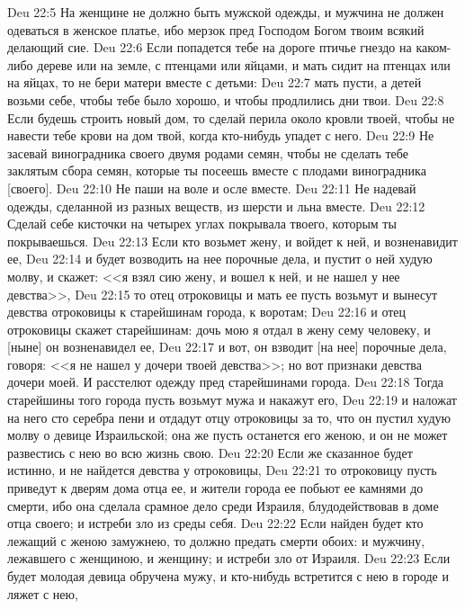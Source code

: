 \rsbpar\vs Deu 22:5 На женщине не должно быть мужской одежды, и мужчина не должен одеваться в женское платье, ибо мерзок пред Господом Богом твоим всякий делающий сие.
\rsbpar\vs Deu 22:6 Если попадется тебе на дороге птичье гнездо на каком-либо дереве или на земле, с птенцами или яйцами, и мать сидит на птенцах или на яйцах, то не бери матери вместе с детьми:
\vs Deu 22:7 мать пусти, а детей возьми себе, чтобы тебе было хорошо, и чтобы продлились дни твои.
\rsbpar\vs Deu 22:8 Если будешь строить новый дом, то сделай перила около кровли твоей, чтобы не навести тебе крови на дом твой, когда кто-нибудь упадет с него.
\rsbpar\vs Deu 22:9 Не засевай виноградника своего двумя родами семян, чтобы не сделать тебе заклятым сбора семян, которые ты посеешь вместе с плодами виноградника [своего].
\vs Deu 22:10 Не паши на воле и осле вместе.
\vs Deu 22:11 Не надевай одежды, сделанной из разных веществ, из шерсти и льна вместе.
\vs Deu 22:12 Сделай себе кисточки на четырех углах покрывала твоего, которым ты покрываешься.
\rsbpar\vs Deu 22:13 Если кто возьмет жену, и войдет к ней, и возненавидит ее,
\vs Deu 22:14 и будет возводить на нее порочные дела, и пустит о ней худую молву, и скажет: <<я взял сию жену, и вошел к ней, и не нашел у нее девства>>,
\vs Deu 22:15 то отец отроковицы и мать ее пусть возьмут и вынесут  девства отроковицы к старейшинам города, к воротам;
\vs Deu 22:16 и отец отроковицы скажет старейшинам: дочь мою я отдал в жену сему человеку, и [ныне] он возненавидел ее,
\vs Deu 22:17 и вот, он взводит [на нее] порочные дела, говоря: <<я не нашел у дочери твоей девства>>; но вот признаки девства дочери моей. И расстелют одежду пред старейшинами города.
\vs Deu 22:18 Тогда старейшины того города пусть возьмут мужа и накажут его,
\vs Deu 22:19 и наложат на него сто  серебра пени и отдадут отцу отроковицы за то, что он пустил худую молву о девице Израильской; она же пусть останется его женою, и он не может развестись с нею во всю жизнь свою.
\vs Deu 22:20 Если же сказанное будет истинно, и не найдется девства у отроковицы,
\vs Deu 22:21 то отроковицу пусть приведут к дверям дома отца ее, и жители города ее побьют ее камнями до смерти, ибо она сделала срамное дело среди Израиля, блудодействовав в доме отца своего; и  истреби зло из среды себя.
\vs Deu 22:22 Если найден будет кто лежащий с женою замужнею, то должно предать смерти обоих: и мужчину, лежавшего с женщиною, и женщину; и  истреби зло от Израиля.
\vs Deu 22:23 Если будет молодая девица обручена мужу, и кто-нибудь встретится с нею в городе и ляжет с нею,
